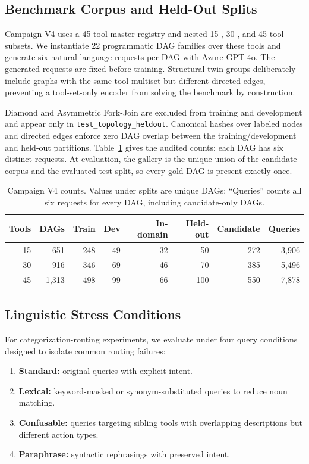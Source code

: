 \documentclass{article}
\begin{document}
\subsection{Benchmark Corpus and Held-Out Splits}
Campaign V4 uses a 45-tool master registry and nested 15-, 30-, and 45-tool subsets. We instantiate 22 programmatic DAG families over these tools and generate six natural-language requests per DAG with Azure GPT-4o. The generated requests are fixed before training. Structural-twin groups deliberately include graphs with the same tool multiset but different directed edges, preventing a tool-set-only encoder from solving the benchmark by construction.

Diamond and Asymmetric Fork-Join are excluded from training and development and appear only in \texttt{test\_topology\_heldout}. Canonical hashes over labeled nodes and directed edges enforce zero DAG overlap between the training/development and held-out partitions. Table~\ref{tab:dataset_v4} gives the audited counts; each DAG has six distinct requests. At evaluation, the gallery is the unique union of the candidate corpus and the evaluated test split, so every gold DAG is present exactly once.

\begin{table}[h]
\caption{Campaign V4 counts. Values under splits are unique DAGs; ``Queries'' counts all six requests for every DAG, including candidate-only DAGs.}
\label{tab:dataset_v4}
\centering
\small
\begin{tabular}{@{}rrrrrrrr@{}}
\toprule
Tools & DAGs & Train & Dev & In-domain & Held-out & Candidate & Queries \\
\midrule
15 & 651  & 248 & 49 & 32 & 50  & 272 & 3,906 \\
30 & 916  & 346 & 69 & 46 & 70  & 385 & 5,496 \\
45 & 1,313 & 498 & 99 & 66 & 100 & 550 & 7,878 \\
\bottomrule
\end{tabular}
\end{table}

\subsection{Linguistic Stress Conditions}
\label{sec:stress}
For categorization-routing experiments, we evaluate under four query conditions designed to isolate common routing failures:
\begin{enumerate}
    \item \textbf{Standard:} original queries with explicit intent.
    \item \textbf{Lexical:} keyword-masked or synonym-substituted queries to reduce noun matching.
    \item \textbf{Confusable:} queries targeting sibling tools with overlapping descriptions but different action types.
    \item \textbf{Paraphrase:} syntactic rephrasings with preserved intent.
\end{enumerate}
\end{document}
